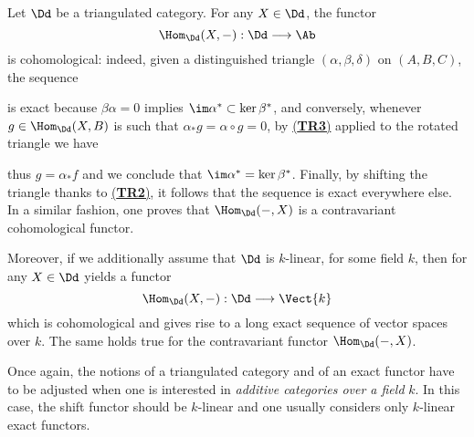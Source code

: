 \begin{ex}
    Let $\Dd$ be a triangulated category. For any $X \in \Dd$,
    the functor 
    $$\Hom_{\Dd}(X,-) : \Dd \longrightarrow \Ab$$ 
    is cohomological: indeed,
    given a distinguished triangle $(\alpha, \beta, \delta)$ 
    on $(A,B,C)$, the sequence
    \begin{center}
    \end{center}
    is exact because $\beta\alpha=0$ implies $\im \alpha^{*} \subset \ker \beta^{*}$,
    and conversely, whenever $g \in \Hom_{\Dd}(X,B)$ is such that
    $\alpha_{*}g = \alpha \circ g = 0$, by \hyperref[TR3]{(\textbf{TR3})} applied
    to the rotated triangle we have
    \begin{center}
    \end{center}
    thus $g = \alpha_{*}f$ and we conclude that $\im \alpha^{*} = \ker \beta^{*}$.
    Finally, by shifting the triangle thanks to \hyperref[TR2]{(\textbf{TR2})},
    it follows that the sequence is exact everywhere else. 
    In a similar fashion, one proves that $\Hom_{\Dd}(-,X)$
    is a contravariant cohomological functor.

    Moreover, if we additionally assume that $\Dd$ is $k$-linear, for some field $k$,
    then for any $X \in \Dd$ yields a functor
    $$\Hom_{\Dd}(X,-) : \Dd \longrightarrow \Vect{k}$$
    which is cohomological and gives rise to a long exact sequence of
    vector spaces over $k$. The same holds true for the
    contravariant functor $\Hom_{\Dd}(-,X)$.
\end{ex}

\begin{rmk}
    Once again, the notions of a triangulated category 
    and of an exact functor have to be adjusted when 
    one is interested in \emph{additive categories 
    over a field} $k$. 
    In this case, the shift functor should be $k$-linear 
    and one usually considers only $k$-linear exact functors.
\end{rmk}

